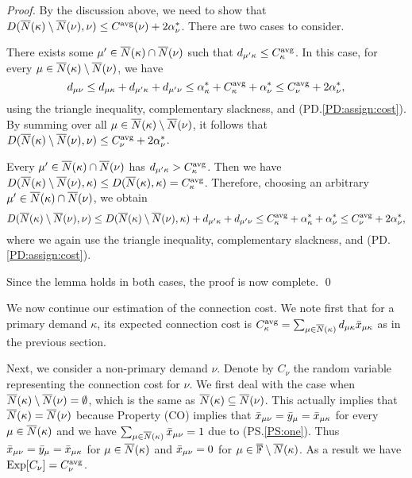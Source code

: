 \documentclass{llncs}
\begin{document}
\begin{proof}
  By the discussion above, we need to show that $D({\overline{N}}(\kappa)
  \setminus {\overline{N}}(\nu), \nu) \leq C^{{\mbox{\scriptsize\rm avg}}}(\nu) +
  2\alpha_{\nu}^\ast$. There are two cases to consider.

\begin{description}
%	
\item{}
	 There exists some $\mu'\in {\overline{N}}(\kappa) \cap
  {\overline{N}}(\nu)$ such that $d_{\mu' \kappa} \leq C^{{\mbox{\scriptsize\rm avg}}}_\kappa$.
In this case, for every $\mu\in {\overline{N}}(\kappa)\setminus {\overline{N}}(\nu)$, we have
%
\begin{equation*}
d_{\mu \nu} \leq d_{\mu \kappa} + d_{\mu' \kappa} + d_{\mu' \nu}  
 	\le  \alpha^\ast_\kappa + C^{{\mbox{\scriptsize\rm avg}}}_\kappa + \alpha^\ast_{\nu}
  \leq C^{{\mbox{\scriptsize\rm avg}}}_\nu + 2\alpha_{\nu}^\ast,
\end{equation*}
%
using the triangle inequality, complementary slackness, and (PD.\ref{PD:assign:cost}).
By summing over all $\mu\in {\overline{N}}(\kappa) \setminus {\overline{N}}(\nu)$, it
follows that $D({\overline{N}}(\kappa) \setminus {\overline{N}}(\nu), \nu) \leq
C^{{\mbox{\scriptsize\rm avg}}}_\nu + 2\alpha_{\nu}^\ast$.

\item{}
 Every $\mu'\in {\overline{N}}(\kappa)\cap {\overline{N}}(\nu)$
has $d_{\mu'\kappa} > C^{{\mbox{\scriptsize\rm avg}}}_\kappa$. Then we
have $D({\overline{N}}(\kappa) \setminus {\overline{N}}(\nu),\kappa)\leq
D({\overline{N}}(\kappa),\kappa)=C^{{\mbox{\scriptsize\rm avg}}}_{\kappa}$. Therefore,
choosing an arbitrary $\mu'\in {\overline{N}}(\kappa)\cap {\overline{N}}(\nu)$,
we obtain
%
\begin{equation*}
  D({\overline{N}}(\kappa) \setminus {\overline{N}}(\nu), \nu) 
	\leq  D({\overline{N}}(\kappa) \setminus {\overline{N}}(\nu), \kappa) 
			+ d_{\mu' \kappa} + d_{\mu' \nu} 
	\leq  C^{{\mbox{\scriptsize\rm avg}}}_{\kappa} +
  \alpha_{\kappa}^\ast + \alpha_{\nu}^\ast
	\leq C^{{\mbox{\scriptsize\rm avg}}}_\nu + 2\alpha_{\nu}^\ast,
\end{equation*}
%
where we again use the triangle inequality,
complementary slackness, and  (PD.\ref{PD:assign:cost}).
%
\end{description}
%
Since the lemma holds in both cases, the proof is now complete.
\qed
\end{proof}

We now continue our estimation of the connection cost. We note first
that for a primary demand $\kappa$, its expected connection cost
is $C^{\mbox{\scriptsize\rm avg}}_{\kappa} = \sum_{\mu\in{\overline{N}}(\kappa)}
d_{\mu\kappa}{\bar x}_{\mu\kappa}$ as in the previous section.

Next, we consider a non-primary demand $\nu$.  Denote by $C_\nu$ the
random variable representing the connection cost for $\nu$. We first
deal with the case when ${\overline{N}}(\kappa)\setminus {\overline{N}}(\nu) =
\emptyset$, which is the same as ${\overline{N}}(\kappa) \subseteq
{\overline{N}}(\nu)$. This actually implies that ${\overline{N}}(\kappa) =
{\overline{N}}(\nu)$ because Property (CO) implies that ${\bar x}_{\mu\nu} =
{\bar y}_{\mu} = {\bar x}_{\mu\kappa}$ for every $\mu \in {\overline{N}}(\kappa)$
and we have $\sum_{\mu\in{\overline{N}}(\kappa)} {\bar x}_{\mu\nu} = 1$ due to
(PS.\ref{PS:one}). Thus ${\bar x}_{\mu\nu} = {\bar y}_{\mu} =
{\bar x}_{\mu\kappa}$ for $\mu \in {\overline{N}}(\kappa)$ and ${\bar x}_{\mu\nu} =
0$ for $\mu\in \overline{\mathbb{F}} \setminus {\overline{N}}(\kappa)$. As a result we
have $\mbox{\rm Exp}[C_{\nu}] = C^{{\mbox{\scriptsize\rm avg}}}_{\nu}$.
\end{document}

